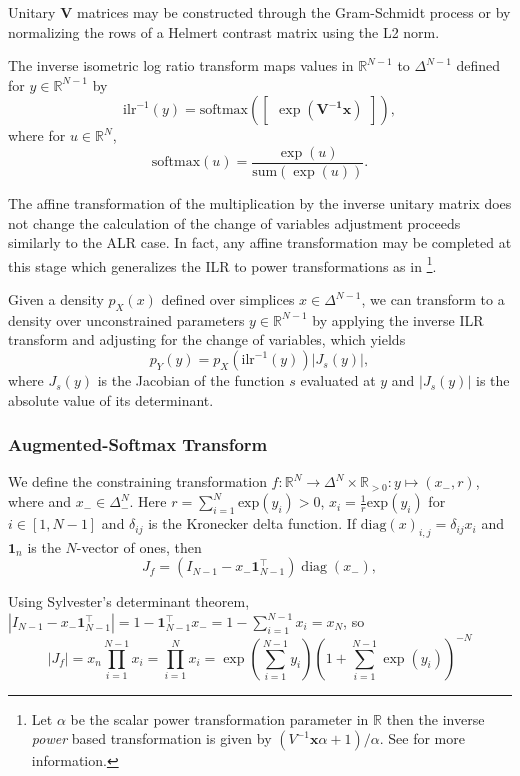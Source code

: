 \documentclass[11pt]{article}
\newcommand{\abs}[1]{\left| #1 \right|}
\newcommand{\absdet}[1]{\abs{#1}}
\begin{document}
Unitary $\mathbf{V}$ matrices may be constructed through the Gram-Schmidt process or by normalizing the rows of a Helmert contrast matrix using the L2 norm.

The inverse isometric log ratio transform maps values in
$\mathbb{R}^{N-1}$ to $\Delta^{N-1}$ defined for $y \in
\mathbb{R}^{N-1}$ by
\[
  \textrm{ilr}^{-1}(y)
  = \textrm{softmax}(\begin{bmatrix} \exp(\mathbf{V^{-1}} \mathbf{x} ) \end{bmatrix}),
\]
where for $u \in \mathbb{R}^N$,
\[
  \textrm{softmax}(u) = \frac{\exp(u)}{\textrm{sum}(\exp(u))}.
\]

The affine transformation of the multiplication by the inverse unitary matrix does not change
the calculation of the change of variables adjustment proceeds similarly to the ALR case. In fact, any affine transformation may be completed at this stage which generalizes the ILR to power transformations as in \cite{tsagris2011data}\footnote{
   Let $\alpha$ be the scalar power transformation parameter in $\mathbb{R}$ then the inverse \textit{power} based transformation is given by $(V^{-1} \mathbf{x} \alpha + 1) / \alpha$. See \cite{tsagris2011data} for more information.
}. 

Given a density $p_X(x)$ defined over simplices $x \in \Delta^{N-1}$,
we can transform to a density over unconstrained parameters $y \in
\mathbb{R}^{N-1}$ by applying the inverse ILR transform and adjusting
for the change of variables, which yields
\[
  p_Y(y) = p_X(\textrm{ilr}^{-1}(y)) \absdet{J_{s}(y)},
\]
where $J_{s}(y)$ is the Jacobian of the function $s$ evaluated at $y$
and $\absdet{J_s(y)}$ is the absolute value of its determinant.

\subsubsection{Augmented-Softmax Transform}
We define the constraining transformation
$f: \mathbb{R}^N \to \Delta^{N} \times \mathbb{R}_{>0}: y \mapsto
(x_-, r)$, where and $x_{-} \in \Delta_{-}^N$. Here $r = \sum_{i=1}^N \textrm{exp}(y_i) > 0$,
$x_i = \frac{1}{r} \textrm{exp}(y_i)$ for $i \in [1, N-1]$ and $\delta_{ij}$ is the Kronecker delta function. If $\mathrm{diag}(x)_{i, j} = \delta_{ij} x_i$ and $\boldsymbol{1}_n$ is the $N$-vector of ones, then
\[
  J_f = (I_{N-1} - x_- \boldsymbol{1}_{N-1}^\top) \operatorname{diag}(x_-),
\] 

Using Sylvester's determinant theorem,
$|I_{N-1} - x_- \boldsymbol{1}_{N-1}^\top| = 1 -
\boldsymbol{1}_{N-1}^\top x_- = 1 - \sum_{i=1}^{N-1} x_i = x_N$, so
$$ |J_f| = x_n \prod_{i=1}^{N-1} x_i = \prod_{i=1}^{N} x_i = \exp\left(\sum_{i=1}^{N-1} y_i\right) \left(1 + \sum_{i=1}^{N-1} \exp(y_i)\right)^{-N}$$
\end{document}

